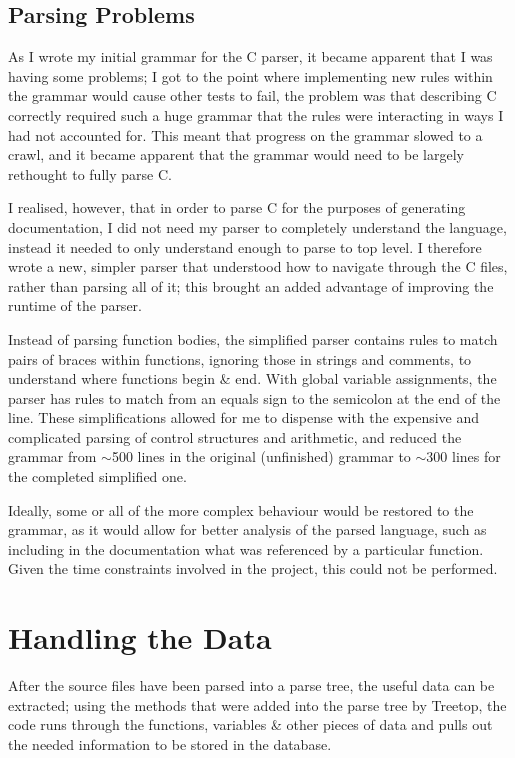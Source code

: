   \subsection{Parsing Problems}
    As I wrote my initial grammar for the C parser, it became apparent that I
    was having some problems; I got to the point where implementing new rules
    within the grammar would cause other tests to fail, the problem was that
    describing C correctly required such a huge grammar that the rules were
    interacting in ways I had not accounted for. This meant that progress on the
    grammar slowed to a crawl, and it became apparent that the grammar would
    need to be largely rethought to fully parse C.

    I realised, however, that in order to parse C for the purposes of generating
    documentation, I did not need my parser to completely understand the
    language, instead it needed to only understand enough to parse to top level.
    I therefore wrote a new, simpler parser that understood how to navigate
    through the C files, rather than parsing all of it; this brought an added
    advantage of improving the runtime of the parser.

    Instead of parsing function bodies, the simplified parser contains rules to
    match pairs of braces within functions, ignoring those in strings and
    comments, to understand where functions begin \& end. With global variable
    assignments, the parser has rules to match from an equals sign to the
    semicolon at the end of the line. These simplifications allowed for me to
    dispense with the expensive and complicated parsing of control structures
    and arithmetic, and reduced the grammar from ${\sim}$500 lines in the
    original (unfinished) grammar to ${\sim}$300 lines for the completed
    simplified one.

    Ideally, some or all of the more complex behaviour would be restored to the
    grammar, as it would allow for better analysis of the parsed language, such
    as including in the documentation what was referenced by a particular
    function. Given the time constraints involved in the project, this could not
    be performed.

\section{Handling the Data}
After the source files have been parsed into a parse tree, the useful data can
be extracted; using the methods that were added into the parse tree by Treetop,
the code runs through the functions, variables \& other pieces of data and pulls
out the needed information to be stored in the database.

